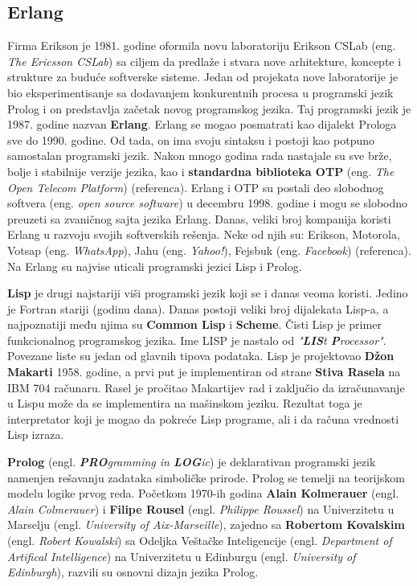 \documentclass[12pt,oneside]{memoir}
\begin{document}
\subsection{Erlang}
Firma Erikson je 1981. godine oformila novu laboratoriju Erikson CSLab (eng. \textit{The Ericsson CSLab}) sa ciljem da predlaže i stvara nove arhitekture, koncepte i strukture za buduće softverske sisteme. Jedan od projekata nove laboratorije  je bio eksperimentisanje sa dodavanjem konkurentnih procesa u programski jezik Prolog i on predstavlja začetak novog programskog jezika. Taj programski jezik je 1987. godine nazvan \textbf{Erlang}. Erlang se mogao posmatrati kao dijalekt Prologa sve do 1990. godine. Od tada, on ima svoju sintaksu i postoji kao potpuno samostalan programski
jezik. Nakon mnogo godina rada nastajale su sve brže, bolje i stabilnije verzije jezika, kao i \textbf{standardna biblioteka OTP} (eng. \textit{The Open Telecom Platform}) (referenca). Erlang i OTP su postali deo slobodnog softvera (eng. \textit{open source software}) u decembru 1998. godine i mogu se slobodno preuzeti sa zvaničnog sajta jezika Erlang. Danas, veliki broj kompanija koristi Erlang u razvoju svojih softverskih rešenja. Neke od
njih su: Erikson, Motorola, Votsap (eng. \textit{WhatsApp}), Jahu (eng. \textit{Yahoo!}),
Fejsbuk (eng. \textit{Facebook}) (referenca).
Na Erlang su najvise uticali programski jezici Lisp i Prolog.

\textbf{Lisp} je drugi najstariji viši programski jezik koji se i danas veoma koristi. Jedino je Fortran stariji (godinu dana). Danas postoji veliki broj dijalekata Lisp-a, a najpoznatiji među njima su \textbf{Common Lisp} i \textbf{Scheme}. Čisti Lisp je primer funkcionalnog programskog jezika. Ime LISP je nastalo od \textit{"\textbf{LIS}t \textbf{P}rocessor"}. Povezane liste su jedan od glavnih tipova podataka. Lisp je projektovao \textbf{Džon Makarti} 1958. godine, a prvi put je implementiran od strane \textbf{Stiva Rasela} na IBM 704 računaru. Rasel je pročitao Makartijev rad i zaključio da izračunavanje u Lispu može da se implementira na mašinskom jeziku. Rezultat toga je interpretator koji je mogao da pokreće Lisp programe, ali i da računa vrednosti Lisp izraza.

\textbf{Prolog} (engl. \textit{\textbf{PRO}gramming in \textbf{LOG}ic}) je deklarativan programski jezik namenjen rešavanju zadataka simboličke prirode. Prolog se temelji na teorijskom modelu logike prvog reda. Početkom 1970-ih godina \textbf{Alain Kolmerauer} (engl. \textit{Alain Colmerauer}) i \textbf{Filipe Rousel} (engl. \textit{Philippe Roussel}) na Univerzitetu u Marselju (engl. \textit{University of Aix-Marseille}), zajedno sa \textbf{Robertom Kovalskim} (engl. \textit{Robert Kowalski}) sa Odeljka Veštačke Inteligencije (engl. \textit{Department of Artifical Intelligence}) na Univerzitetu u Edinburgu (engl. \textit{University of Edinburgh}), razvili su osnovni dizajn jezika Prolog.
\end{document}
